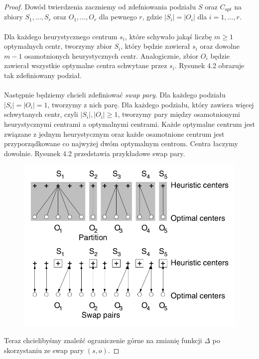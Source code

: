 \begin{proof}
    Dowód twierdzenia zaczniemy od zdefniowania podziału $S$ oraz $C_{opt}$ na zbiory $S_{1}, \dots, S_{r}$ oraz $O_{1}, \dots, O_{r}$ dla pewnego $r$, gdzie $|S_{i}| = |O_{i}|$ dla $i = 1, \dots, r$.
    \\~\\
    Dla każdego heurystycznego centrum $s_{i}$, które schywało jakąś liczbę $m \geq 1$ optymalnych centr, tworzymy zbior $S_{i}$, który będzie zawierał $s_{i}$ oraz dowolne $m-1$ osamotnionych heurystycznych centr.
    Analogicznie, zbior $O_{i}$ będzie zawierał wszystkie optymalne centra schwytane przez $s_{i}$.
    Rysunek 4.2 obrazuje tak zdefiniowany podział.
    \\~\\
    \noindent
    Następnie będziemy chcieli zdefiniować \textit{swap pary}.
    Dla każdego podziału $|S_{i}| = |O_{i}| = 1$, tworzymy z nich parę.
    Dla każdego podziału, który zawiera więcej schwytanych centr, czyli $|S_{i}|, |O_{i}| \geq 1$, tworzymy pary między osamotnionymi heurystycznymi centrami a optymalnymi centrami.
    Każde optymalne centrum jest związane z jednym heurystycznym oraz każde osamotnione centrum jest przyporządkowane co najwyżej dwóm optymalnym centrom.
    Centra łaczymy dowolnie. 
    Rysunek 4.2 przedstawia przykładowe swap pary.
    \begin{figure}[H]
        \centering
        \includegraphics[totalheight=8cm]{swap.png}
        \caption{}
    \end{figure}
    Teraz chcielibyśmy znaleźć ograniczenie górne na zmianię funkcji $\Delta$ po skorzystaniu ze swap pary $(s, o)$.

\end{proof}
